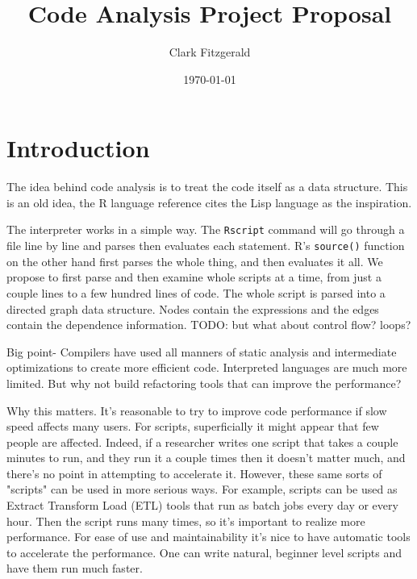 \documentclass[12pt]{article}
\begin{document}
\title{Code Analysis Project Proposal}
\date{\today}
\author{Clark Fitzgerald}
\maketitle

\begin{abstract}

\end{abstract}

\section{Introduction}

The idea behind code analysis is to treat the code itself as a data
structure. This is an old idea, the R language reference cites the Lisp
language as the inspiration.

The interpreter works in a simple way. The \texttt{Rscript} command will go
through a file line by line and parses then
evaluates each statement. R's \texttt{source()} function on the other hand
first parses the whole thing, and then evaluates it all. We propose to
first parse and then examine whole scripts at a time, from just a couple
lines to a few hundred lines of code.  The whole script is parsed into a
directed graph data structure. Nodes contain the expressions and the edges
contain the dependence information.  TODO: but what about control flow?
loops?

Big point- Compilers have used all manners of static analysis and
intermediate optimizations to create more efficient code. Interpreted
languages are much more limited. But why not build refactoring tools that
can improve the performance?

Why this matters. It's reasonable to try to improve code performance if
slow speed affects many users. For scripts, superficially it might appear
that few people are affected. Indeed, if a researcher writes one script that
takes a couple minutes to run, and they run it a couple times then it
doesn't matter much, and there's no point in attempting to accelerate it.
However, these same sorts of "scripts" can be used in more serious ways.
For example, scripts can be used as Extract Transform Load (ETL) tools that
run as batch jobs every day or every hour. Then the script runs
many times, so it's important to realize more performance. For
ease of use and maintainability it's nice to have automatic tools to
accelerate the performance. One can write natural, beginner level scripts
and have them run much faster.
\end{document}
